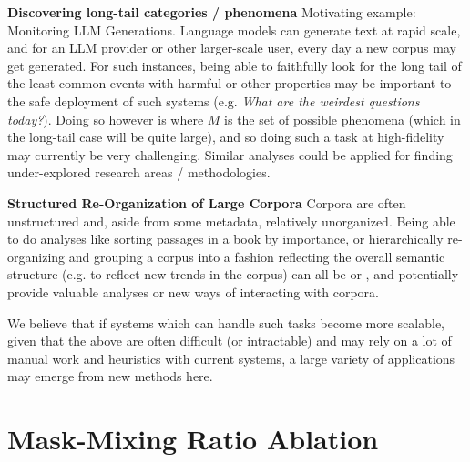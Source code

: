 \textbf{Discovering long-tail categories / phenomena} Motivating example: Monitoring LLM Generations. Language models can generate text at rapid scale, and for an LLM provider or other larger-scale user, every day a new corpus may get generated. For such instances, being able to faithfully look for the long tail of the least common events with harmful or other properties may be important to the safe deployment of such systems (e.g. \emph{What are the weirdest questions today?}). Doing so however is  where $M$ is the set of possible phenomena (which in the long-tail case will be quite large), and so doing such a task at high-fidelity may currently be very challenging. Similar analyses could be applied for finding under-explored research areas / methodologies. 

\textbf{Structured Re-Organization of Large Corpora} Corpora are often unstructured and, aside from some metadata, relatively unorganized. Being able to do analyses like sorting passages in a book by importance, or hierarchically re-organizing and grouping a corpus into a fashion reflecting the overall semantic structure (e.g. to reflect new trends in the corpus) can all be  or , and potentially provide valuable analyses or new ways of interacting with corpora.

We believe that if systems which can handle such tasks become more scalable, given that the above are often difficult (or intractable) and may rely on a lot of manual work and heuristics with current systems, a large variety of applications may emerge from new methods here.




\section{Mask-Mixing Ratio Ablation}
\label{app:mask-mix-ablation}

